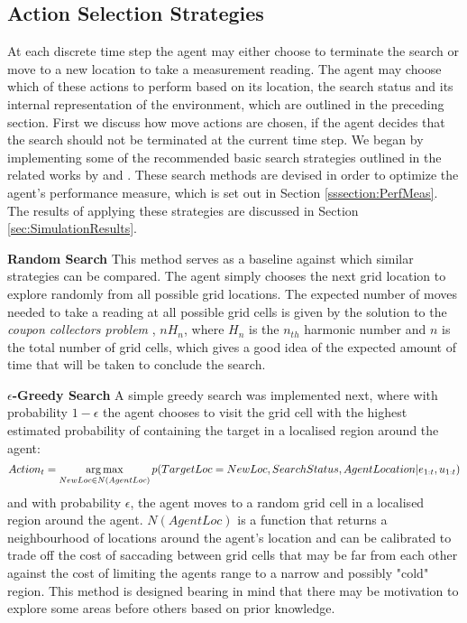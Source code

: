 \subsection{Action Selection Strategies}\label{subsubsec:ActionSelection}
At each discrete time step the agent may either choose to terminate the search or move to a new location to take a measurement reading. The agent may choose which of these actions to perform based on its location, the search status and its internal representation of the environment, which are outlined in the preceding section. First we discuss how move actions are chosen, if the agent decides that the search should not be terminated at the current time step. We began by implementing some of the recommended basic search strategies outlined in the related works by \citeauthor{Chung2007ASearch} \cite{Chung2007ASearch} and \citeauthor{Waharte2010SupportingUAVs} \cite{Waharte2010SupportingUAVs}. These search methods are devised in order to optimize the agent's performance measure, which is set out in Section \ref{sssection:PerfMeas}. The results of applying these strategies are discussed in Section \ref{sec:SimulationResults}.\par 
\textbf{Random Search}
This method serves as a baseline against which similar strategies can be compared. The agent simply chooses the next grid location to explore randomly from all possible grid locations. The expected number of moves needed to take a reading at all possible grid cells is given by the solution to the \textit{coupon collectors problem} \cite{Erdos1961OnTheory}, $nH_n$, where $H_n$ is the $n_{th}$ harmonic number and $n$ is the total number of grid cells, which gives a good idea of the expected amount of time that will be taken to conclude the search.

\textbf{$\epsilon$-Greedy Search}
A simple greedy search was implemented next, where with probability $1-\epsilon$ the agent chooses to visit the grid cell with the highest estimated probability of containing the target in a localised region around the agent:
\footnotesize
\[
Action_t = \operatorname*{arg\,max}_{NewLoc \in N(AgentLoc)}{p(TargetLoc = NewLoc, SearchStatus, AgentLocation| e_{1:t}, u_{1:t})}
\]
\normalsize
and with probability $\epsilon$, the agent moves to a random grid cell in a localised region around the agent.
$N(AgentLoc)$ is a function that returns a neighbourhood of locations around the agent's location and can be calibrated to trade off the cost of saccading between grid cells that may be far from each other against the cost of limiting the agents range to a narrow and possibly "cold" region. This method is designed bearing in mind that there may be motivation to explore some areas before others based on prior knowledge. 

